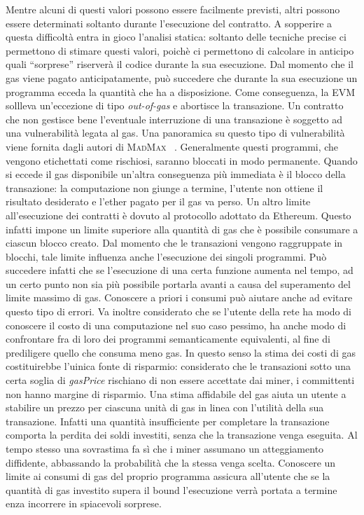 	Mentre alcuni di questi valori possono essere facilmente previsti, altri possono essere determinati soltanto durante l'esecuzione del contratto. A sopperire a questa difficoltà entra in gioco l'analisi statica: soltanto delle tecniche precise ci permettono di stimare questi valori, poichè ci permettono di calcolare in anticipo quali ``sorprese'' riserverà il codice durante la sua esecuzione.\newline
	\indent Dal momento che il gas viene pagato anticipatamente, può succedere che durante la sua
	esecuzione un programma ecceda la quantità che ha a disposizione. Come conseguenza, la EVM
	sollleva un'eccezione di tipo \textit{out-of-gas} e abortisce la transazione. Un contratto
	che non gestisce bene l'eventuale interruzione di una transazione è soggetto ad una 
	vulnerabilità legata al gas. Una panoramica su questo tipo di vulnerabilità viene fornita dagli autori di \textsc{MadMax} ~\cite{grech2018madmax}. Generalmente questi programmi, che vengono etichettati
	come rischiosi, saranno bloccati in modo permanente.
	Quando si eccede il gas disponibile un'altra conseguenza più immediata è il
	blocco della transazione: la computazione non giunge a termine, l'utente non ottiene il
	risultato desiderato e l'ether pagato per il gas va perso.\newline
	\indent Un altro limite all'esecuzione dei contratti è dovuto al protocollo adottato da Ethereum.
	Questo infatti impone un limite superiore alla quantità di gas che è possibile consumare
	a ciascun blocco creato. Dal momento che le transazioni vengono raggruppate in blocchi,
	tale limite influenza anche l'esecuzione dei singoli programmi. Può succedere infatti che
	se l'esecuzione di una certa funzione aumenta nel tempo, ad un certo punto non sia
	più possibile portarla avanti a causa del superamento del limite massimo di gas.
	Conoscere a priori i consumi può aiutare anche ad evitare questo tipo di errori.\newline
	\indent Va inoltre considerato che se l'utente della rete ha modo di conoscere il costo
	di una computazione nel suo caso pessimo, ha anche modo di confrontare fra di loro dei programmi
	semanticamente equivalenti, al fine di prediligere quello che consuma meno gas.  In questo 
	senso la stima dei costi di gas costituirebbe l'uinica fonte di risparmio: considerato
	che le transazioni sotto una certa soglia di \textit{gasPrice} rischiano di non essere 
	accettate dai miner, i committenti non hanno margine di risparmio.\newline
	\indent Una stima affidabile del gas aiuta un utente a stabilire un prezzo per ciascuna
	unità di gas in linea con l'utilità della sua transazione. Infatti una quantità 
	insufficiente per completare la transazione comporta la perdita dei soldi investiti,
	senza che la transazione venga eseguita. Al tempo stesso una sovrastima fa sì che i
	miner assumano un atteggiamento diffidente, abbassando la probabilità che la stessa
	venga scelta.\newline
	\indent Conoscere un limite ai consumi di gas del proprio programma assicura all'utente
	che se la quantità di gas investito supera il bound l'esecuzione verrà portata a termine
	 enza incorrere in spiacevoli sorprese.

